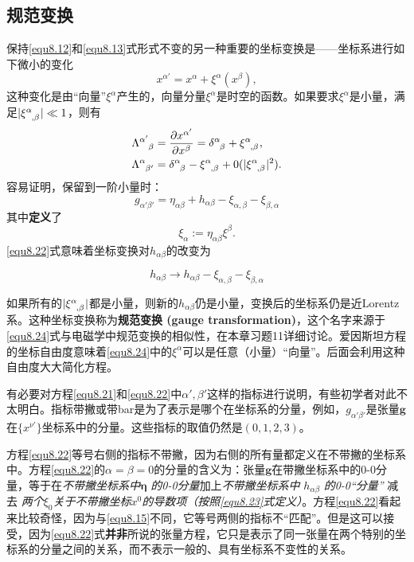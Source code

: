 \subsection*{规范变换}
保持\eqref{equ8.12}和\eqref{equ8.13}式形式不变的另一种重要的坐标变换是——坐标系进行如下微小的变化
\[
    x^{\alpha'} = x^\alpha + \xi^\alpha (x^\beta),
\]
这种变化是由“向量”$\xi^\alpha$产生的，向量分量$\xi^\alpha$是时空的函数。如果要求$\xi^\alpha$是小量，满足$| \xi\indices{^\alpha_{, \beta}}| \ll 1$，则有
\begin{align}
    \Lambda\indices{^{\alpha'}_\beta} &= \frac{\partial x^{\alpha'}}{\partial x^\beta} = \delta\indices{^\alpha_\beta} + \xi\indices{^\alpha_{, \beta}}, \label{equ8.20} \\
    \Lambda\indices{^\alpha_{\beta'}} &= \delta\indices{^\alpha_\beta} - \xi\indices{^\alpha_{, \beta}} + 0(|\xi\indices{^\alpha_{, \beta}}|^2). \label{equ8.21}
\end{align}
容易证明，保留到一阶小量时：
\begin{equation}
    g_{\alpha' \beta'} = \eta_{\alpha \beta} + h_{\alpha \beta} - \xi_{\alpha, \beta} - \xi_{\beta, \alpha}
\label{equ8.22}
\end{equation}
其中\textbf{定义}了
\begin{equation}
    \xi_\alpha := \eta_{\alpha \beta} \xi^\beta.
\label{equ8.23}
\end{equation}
\eqref{equ8.22}式意味着坐标变换对$h_{\alpha \beta}$的改变为
\begin{shaded}
\begin{equation}
    h_{\alpha \beta} \to h_{\alpha \beta} - \xi_{\alpha, \beta} - \xi_{\beta, \alpha}
\label{equ8.24}
\end{equation}
\end{shaded}
如果所有的$|\xi\indices{^\alpha_{, \beta}}|$都是小量，则新的$h_{\alpha \beta}$仍是小量，变换后的坐标系仍是近Lorentz系。这种坐标变换称为\textbf{规范变换 (gauge transformation)}，这个名字来源于\eqref{equ8.24}式与电磁学中规范变换的相似性，在本章习题11详细讨论。爱因斯坦方程的坐标自由度意味着\eqref{equ8.24}中的$\xi^\alpha$可以是任意（小量）“向量”。后面会利用这种自由度大大简化方程。

有必要对方程\eqref{equ8.21}和\eqref{equ8.22}中$\alpha', \beta'$这样的指标进行说明，有些初学者对此不太明白。指标带撇或带bar是为了表示是哪个在坐标系的分量，例如，$g_{\alpha' \beta'}$是张量$\mathbf{g}$在$\{ x^{\nu'} \}$坐标系中的分量。这些指标的取值仍然是$(0, 1, 2, 3)$。

方程\eqref{equ8.22}等号右侧的指标不带撇，因为右侧的所有量都定义在不带撇的坐标系中。方程\eqref{equ8.22}的$\alpha = \beta = 0$的分量的含义为：张量$\mathbf{g}$在带撇坐标系中的0-0分量，等于在\textit{不带撇坐标系中}$\bm{\eta}$ \textit{的0-0分量}加上\textit{不带撇坐标系中} $h_{\alpha \beta}$ \textit{的0-0“分量”} 减去 \textit{两个$\xi_0$关于不带撇坐标$x^0$的导数项（按照\eqref{equ8.23}式定义）}。方程\eqref{equ8.22}看起来比较奇怪，因为与\eqref{equ8.15}不同，它等号两侧的指标不“匹配”。但是这可以接受，因为\eqref{equ8.22}式\textbf{并非}所说的张量方程，它只是表示了同一张量在两个特别的坐标系的分量之间的关系，而不表示一般的、具有坐标系不变性的关系。

